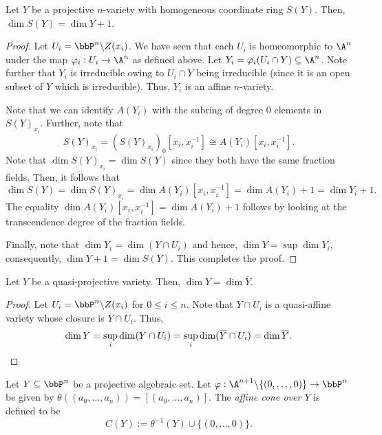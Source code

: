 \begin{theorem}
    Let $Y$ be a projective $n$-variety with homogeneous coordinate ring $S(Y)$. Then, $\dim S(Y) = \dim Y + 1$.
\end{theorem}
\begin{proof}
    Let $U_i = \bbP^n\backslash Z(x_i)$. We have seen that each $U_i$ is homeomorphic to $\A^n$ under the map $\varphi_i: U_i\to\A^n$ as defined above. Let $Y_i = \varphi_i(U_i\cap Y)\subseteq\A^n$. Note further that $Y_i$ is irreducible owing to $U_i\cap Y$ being irreducible (since it is an open subset of $Y$ which is irreducible). Thus, $Y_i$ is an affine $n$-variety. 

    Note that we can identify $A(Y_i)$ with the subring of degree $0$ elements in $S(Y)_{x_i}$. Further, note that 
    \begin{equation*}
        S(Y)_{x_i} = \left(S(Y)_{x_i}\right)_0[x_i, x_i^{-1}]\cong A(Y_i)[x_i, x_i^{-1}].
    \end{equation*}
    Note that $\dim S(Y)_{x_i} = \dim S(Y)$ since they both have the same fraction fields. Then, it follows that 
    \begin{equation*}
        \dim S(Y) = \dim S(Y)_{x_i} = \dim A(Y_i)[x_i, x_i^{-1}] = \dim A(Y_i) + 1 = \dim Y_i + 1.
    \end{equation*}
    The equality $\dim A(Y_i)[x_i, x_i^{-1}] = \dim A(Y_i) + 1$ follows by looking at the transcendence degree of the fraction fields.

    Finally, note that $\dim Y_i = \dim (Y\cap U_i)$ and hence, $\dim Y = \sup\dim Y_i$, consequently, $\dim Y + 1 = \dim S(Y)$. This completes the proof.
\end{proof}

\begin{corollary}
    Let $Y$ be a quasi-projective variety. Then, $\dim Y = \dim\overline Y$.
\end{corollary}
\begin{proof}
    Let $U_i = \bbP^n\backslash Z(x_i)$ for $0\le i\le n$. Note that $Y\cap U_i$ is a quasi-affine variety whose closure is $\overline Y\cap U_i$. Thus, 
    \begin{equation*}
        \dim Y = \sup_{i}\dim(Y\cap U_i) = \sup_i\dim(\overline{Y}\cap U_i) = \dim\overline Y.\qedhere
    \end{equation*}
\end{proof}

\begin{definition}
    Let $Y\subseteq\bbP^n$ be a projective algebraic set. Let $\varphi:\A^{n + 1}\backslash\{(0,\dots,0)\}\to\bbP^n$ be given by $\theta((a_0,\dots,a_n)) = [(a_0,\dots,a_n)]$. The \emph{affine cone over $Y$} is defined to be 
    \begin{equation*}
        C(Y) := \theta^{-1}(Y)\cup\{(0,\dots,0)\}.
    \end{equation*}
\end{definition}


